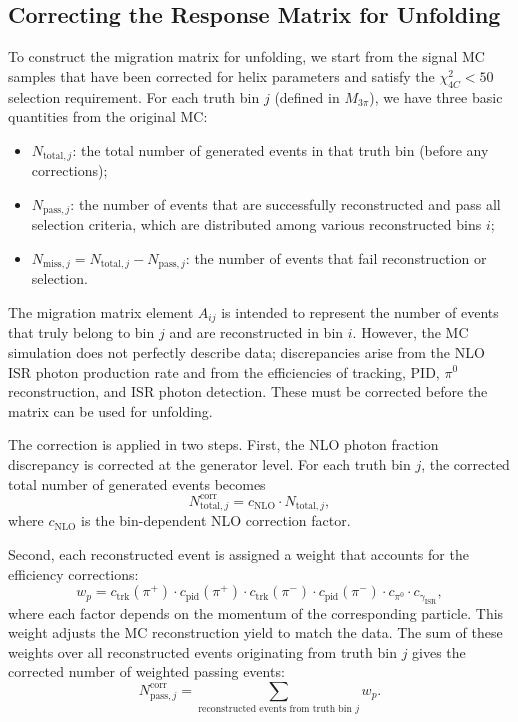 \subsection{Correcting the Response Matrix for Unfolding}
\label{sec:correction_method}
To construct the migration matrix for unfolding, we start from the signal MC samples that have been corrected for helix parameters and satisfy the $\chi^2_{4C} < 50$ selection requirement. For each truth bin $j$ (defined in $M_{3\pi}$), we have three basic quantities from the original MC:
\begin{itemize}
    \item $N_{\text{total},j}$: the total number of generated events in that truth bin (before any corrections);
    \item $N_{\text{pass},j}$: the number of events that are successfully reconstructed and pass all selection criteria, which are distributed among various reconstructed bins $i$;
    \item $N_{\text{miss},j} = N_{\text{total},j} - N_{\text{pass},j}$: the number of events that fail reconstruction or selection.
\end{itemize}

The migration matrix element $A_{ij}$ is intended to represent the number of events that truly belong to bin $j$ and are reconstructed in bin $i$. However, the MC simulation does not perfectly describe data; discrepancies arise from the NLO ISR photon production rate and from the efficiencies of tracking, PID, $\pi^0$ reconstruction, and ISR photon detection. These must be corrected before the matrix can be used for unfolding.

The correction is applied in two steps. First, the NLO photon fraction discrepancy is corrected at the generator level. For each truth bin $j$, the corrected total number of generated events becomes
\[
N_{\text{total},j}^{\text{corr}} = c_{\text{NLO}} \cdot N_{\text{total},j},
\]
where $c_{\text{NLO}}$ is the bin-dependent NLO correction factor.

Second, each reconstructed event is assigned a weight that accounts for the efficiency corrections:
\[
w_p = c_{\text{trk}}(\pi^+) \cdot c_{\text{pid}}(\pi^+) \cdot c_{\text{trk}}(\pi^-) \cdot c_{\text{pid}}(\pi^-) \cdot c_{\pi^0} \cdot c_{\gamma_{\text{ISR}}},
\]
where each factor depends on the momentum of the corresponding particle. This weight adjusts the MC reconstruction yield to match the data. The sum of these weights over all reconstructed events originating from truth bin $j$ gives the corrected number of weighted passing events:
\[
N_{\text{pass},j}^{\text{corr}} = \sum_{\text{reconstructed events from truth bin }j} w_p.
\]

